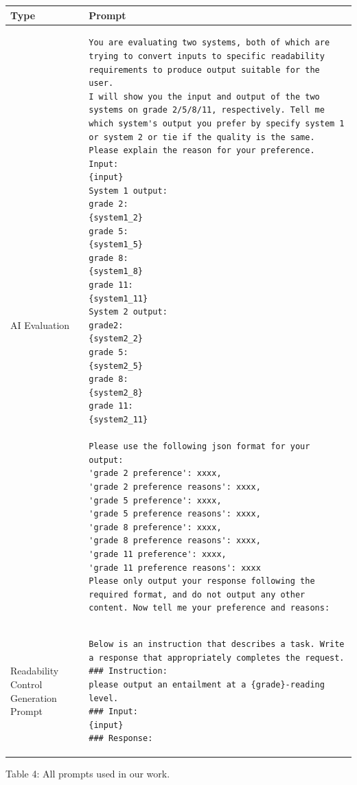 \documentclass[11pt]{article}
\begin{document}
{\tiny
\centering


\begin{tabular}{|p{1cm}|p{13.5cm}|}
\hline
\textbf{Type}  & \textbf{Prompt} \\ \hline
AI Evaluation & 
\begin{lstlisting}
You are evaluating two systems, both of which are trying to convert inputs to specific readability requirements to produce output suitable for the user.
I will show you the input and output of the two systems on grade 2/5/8/11, respectively. Tell me which system's output you prefer by specify system 1 or system 2 or tie if the quality is the same. Please explain the reason for your preference.
Input:
{input}
System 1 output:
grade 2:
{system1_2}
grade 5:
{system1_5}
grade 8:
{system1_8}
grade 11:
{system1_11}
System 2 output:
grade2:
{system2_2}
grade 5:
{system2_5}
grade 8:
{system2_8}
grade 11:
{system2_11}

Please use the following json format for your output:
'grade 2 preference': xxxx,
'grade 2 preference reasons': xxxx,
'grade 5 preference': xxxx,
'grade 5 preference reasons': xxxx,
'grade 8 preference': xxxx,
'grade 8 preference reasons': xxxx,
'grade 11 preference': xxxx,
'grade 11 preference reasons': xxxx
Please only output your response following the required format, and do not output any other content. Now tell me your preference and reasons:

\end{lstlisting}
\\ \hline
Readability Control Generation Prompt & 
\begin{lstlisting}
Below is an instruction that describes a task. Write a response that appropriately completes the request.
### Instruction:
please output an entailment at a {grade}-reading level.
### Input:
{input}
### Response:
\end{lstlisting}
\\ \hline

\end{tabular}

\small
Table 4: All prompts used in our work.



}
\end{document}
